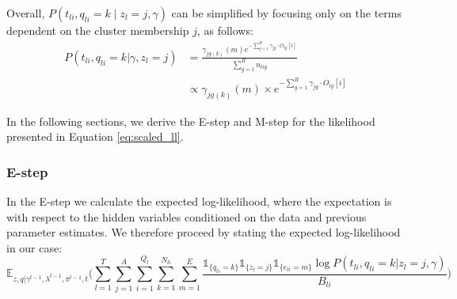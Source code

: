 Overall, \( P(t_{li}, q_{li} = k \mid z_l = j, \gamma) \) can be simplified by focusing only on the terms dependent on the cluster membership \( j \), as follows:
\begin{align}
    P(t_{li}, q_{li} = k \vert \gamma, z_l = j ) &= \frac{\gamma_{jg(k)}(m)e^{-\sum_{g=1}^R \gamma_{jg}\cdot O_{lg}[i]}}{\sum_{g=1}^R n_{lig}} \nonumber \\
    &\propto \gamma_{jg(k)}(m) \times e^{-\sum_{g=1}^R \gamma_{jg}\cdot O_{lg}[i]}
    \label{eq:likelihood}
\end{align}

In the following sections, we derive the E-step and M-step for the likelihood presented in Equation \ref{eq:scaled_ll}.
 
\subsubsection{E-step}

In the E-step we calculate the expected log-likelihood, where the expectation is with respect to the hidden variables conditioned on the data and previous parameter estimates. We therefore proceed by stating the expected log-likelihood in our case:
\begin{equation}
   \mathbb{E}_{z, q \vert \gamma^{t-1}, \lambda^{t-1}, \pi^{t-1}, t} \Big(  \sum_{l = 1}^T \sum_{j = 1}^A \sum_{i = 1}^{Q_l} \sum_{k =1}^{N_{li}} \sum_{m = 1}^E  \frac{\mathds{1}_{\{q_{l i} = k\}} \mathds{1}_{\{z_l = j\}} \mathds{1}_{\{e_{l i} = m\}} \log P(t_{li}, q_{l i} = k \vert z_l = j, \gamma)}{B_{li}} \Big)
 \end{equation}

